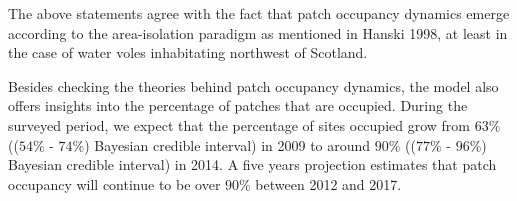 \documentclass[12pt,a4paper]{article}
\begin{document}
The above statements agree with the fact that patch occupancy dynamics emerge according to the area-isolation paradigm as mentioned in Hanski 1998, at least in the case of water voles inhabitating northwest of Scotland.

Besides checking the theories behind patch occupancy dynamics, the model also offers insights into the percentage of patches that are occupied. During the surveyed period, we expect that the percentage of sites occupied grow from $63\%$ (($54\%$ - $74\%$) Bayesian credible interval) in 2009 to around $90\%$ (($77\%$ - $96\%$) Bayesian credible interval) in 2014. A five years projection estimates that patch occupancy will continue to be over $90\%$ between 2012 and 2017.
\maketitle
\end{document}
